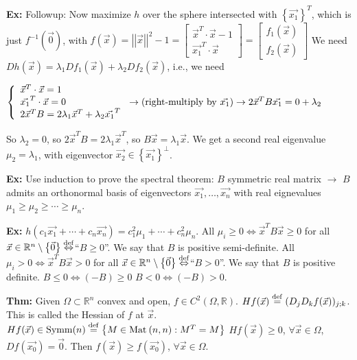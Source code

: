 \documentclass[10pt,letterpaper]{article}
\newcommand{\n}{\hfill\break}
\newcommand{\thm}[1]{\par\noindent\settowidth{\hangindent}{\textbf{Thm: }}\textbf{Thm: }#1\n}
\newcommand{\ex}[1]{\par\noindent\settowidth{\hangindent}{\textbf{Ex: }}\textbf{Ex: }#1\n}
\newcommand{\ptxt}[1]{\textrm{\textnormal{#1}}}
\newcommand{\inlineeq}[1]{\centerline{$\displaystyle #1$}}
\newcommand{\set}[1]{\left\{#1\right\}}
\newcommand{\reals}{\mathbb{R}}
\newcommand{\R}{\reals}
\newcommand{\inv}{^{-1}}
\newcommand{\abs}[1]{\left|#1\right|}
\newcommand{\norm}[1]{\abs{\abs{#1}}}
\newcommand{\tpose}{^{T}}
\newcommand{\Mat}{\ptxt{Mat}\>}
\begin{document}
\ex{Followup: Now maximize $h$ over the sphere intersected with $\set{\vec{x_{1}}}\tpose$, which is just $f\inv(\vec{0})$, with\n
$f(\vec{x})=\norm{\vec{x}}^{2}-1=\left[\begin{array}{c}\vec{x}\tpose\cdot\vec{x}-1\\ \vec{x_{1}}\tpose\cdot\vec{x}\end{array}\right]=\left[\begin{array}{c}f_{1}(\vec{x})\\ f_{2}(\vec{x})\end{array}\right]$\n
\n
We need $Dh(\vec{x})=\lambda_{1}Df_{1}(\vec{x})+\lambda_{2}Df_{2}(\vec{x})$, i.e., we need\n
\inlineeq{\left\{\begin{array}{l}\vec{x}\tpose\cdot\vec{x}=1\\ \vec{x_{1}}\tpose\cdot\vec{x}=0\\ 2\vec{x}\tpose{}B=2\lambda_{1}\vec{x}\tpose+\lambda_{2}\vec{x_{1}}\tpose\end{array}\right.\to(\ptxt{right-multiply by }\vec{x_{1}})\to{}2\vec{x}\tpose{}B\vec{x_{1}}=0+\lambda_{2}}\n
So $\lambda_{2}=0$, so $2\vec{x}\tpose{}B=2\lambda_{1}\vec{x}\tpose$, so $B\vec{x}=\lambda_{1}\vec{x}$. We get a second real eigenvalue $\mu_{2}=\lambda_{1}$, with eigenvector $\vec{x_{2}}\in\set{\vec{x_{1}}}^{\perp}$.}

\ex{Use induction to prove the spectral theorem:\n
$B$ symmetric real matrix $\to$ $B$ admits an orthonormal basis of eigenvectors $\vec{x_{1}},\ldots,\vec{x_{n}}$ with real eignevalues $\mu_{1}\ge\mu_{2}\ge\cdots\ge\mu_{n}$.}

\ex{$h(c_{1}\vec{x_{1}}+\cdots+c_{n}\vec{x_{n}})=c_{1}^{2}\mu_{1}+\cdots+c_{n}^{2}\mu_{n}$.\n
All $\mu_{i}\ge{}0\Leftrightarrow\vec{x}\tpose{}B\vec{x}\ge0$ for all $\vec{x}\in\R^{n}\setminus\set{\vec{0}}\overset{\ptxt{def}}{\Leftrightarrow}$``$B\ge{}0$''. We say that $B$ is positive semi-definite.\n
All $\mu_{i}>0\Leftrightarrow\vec{x}\tpose{}B\vec{x}>0$ for all $\vec{x}\in\R^{n}\setminus\set{\vec{0}}\overset{\ptxt{def}}{\Leftrightarrow}$``$B>0$''. We say that $B$ is positive definite.\n
$B\le{}0\Leftrightarrow(-B)\ge{}0$\n
$B<0\Leftrightarrow(-B)>0$.}

\thm{Given $\Omega\subset\R^{n}$ convex and open, $f\in{}C^{2}(\Omega,\R)$.\n
$Hf(\vec{x})\overset{\ptxt{def}}{=}(D_{j}D_{k}f(\vec{x}))_{j;k}$. This is called the Hessian of $f$ at $\vec{x}$.\n
$Hf(\vec{x})\in\ptxt{Symm}(n)\overset{\ptxt{def}}{=}\set{M\in\Mat(n,n):M\tpose=M}$\n
$Hf(\vec{x})\ge{}0$, $\forall\vec{x}\in\Omega$, $Df(\vec{x_{0}})=\vec{0}$.\n
\n
Then $f(\vec{x})\ge{}f(\vec{x_{0}})$, $\forall\vec{x}\in\Omega$.}
\end{document}
